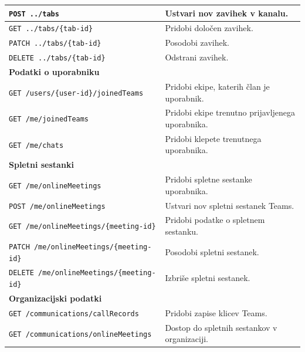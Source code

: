 \documentclass[a4paper, 12pt]{book}
\begin{document}
\begin{longtable}{|p{6cm}|p{8cm}|}
\texttt{POST ../tabs} &
Ustvari nov zavihek v kanalu. \\
\hline

\texttt{GET ../tabs/\{tab-id\}} &
Pridobi določen zavihek. \\
\hline

\texttt{PATCH ../tabs/\{tab-id\}} &
Posodobi zavihek. \\
\hline

\texttt{DELETE ../tabs/\{tab-id\}} &
Odstrani zavihek. \\
\hline

\multicolumn{2}{|l|}{\textbf{Podatki o uporabniku}} \\
\hline

\texttt{GET /users/\{user-id\}/joinedTeams} &
Pridobi ekipe, katerih član je uporabnik. \\
\hline

\texttt{GET /me/joinedTeams} &
Pridobi ekipe trenutno prijavljenega uporabnika. \\
\hline

\texttt{GET /me/chats} &
Pridobi klepete trenutnega uporabnika. \\
\hline

\multicolumn{2}{|l|}{\textbf{Spletni sestanki}} \\
\hline

\texttt{GET /me/onlineMeetings} &
Pridobi spletne sestanke uporabnika. \\
\hline

\texttt{POST /me/onlineMeetings} &
Ustvari nov spletni sestanek Teams. \\
\hline

\texttt{GET /me/onlineMeetings/\{meeting-id\}} &
Pridobi podatke o spletnem sestanku. \\
\hline

\texttt{PATCH /me/onlineMeetings/\{meeting-id\}} &
Posodobi spletni sestanek. \\
\hline

\texttt{DELETE /me/onlineMeetings/\{meeting-id\}} &
Izbriše spletni sestanek. \\
\hline

\multicolumn{2}{|l|}{\textbf{Organizacijski podatki}} \\
\hline

\texttt{GET /communications/callRecords} &
Pridobi zapise klicev Teams. \\
\hline

\texttt{GET /communications/onlineMeetings} &
Dostop do spletnih sestankov v organizaciji. \\
\hline

\end{longtable}
\end{document}
